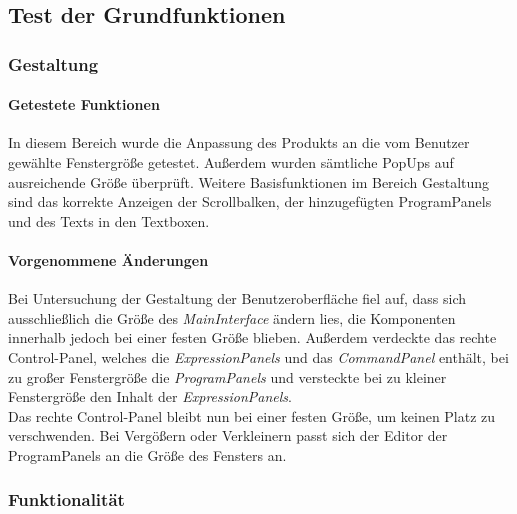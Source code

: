 \documentclass[parskip=full]{scrartcl}
\begin{document}
\subsection{Test der Grundfunktionen}
\subsubsection{Gestaltung}
\paragraph{Getestete Funktionen}
In diesem Bereich wurde die Anpassung des Produkts an die vom Benutzer gewählte Fenstergröße getestet. Außerdem wurden sämtliche PopUps auf ausreichende Größe überprüft.
Weitere Basisfunktionen im Bereich Gestaltung sind das korrekte Anzeigen der Scrollbalken, der hinzugefügten ProgramPanels und des Texts in den Textboxen.
\paragraph{Vorgenommene Änderungen}
Bei Untersuchung der Gestaltung der Benutzeroberfläche  fiel auf, dass sich ausschließlich die Größe des \textit{MainInterface} ändern lies, die Komponenten innerhalb jedoch bei einer festen Größe blieben. Außerdem verdeckte das rechte Control-Panel, welches die \textit{ExpressionPanels} und das \textit{CommandPanel} enthält, bei zu großer Fenstergröße die \textit{ProgramPanels} und versteckte bei zu kleiner Fenstergröße den Inhalt der \textit{ExpressionPanels}.\\
Das rechte Control-Panel bleibt nun bei einer festen Größe, um keinen Platz zu verschwenden. Bei Vergößern oder Verkleinern passt sich der Editor der ProgramPanels an die Größe des Fensters an.
\subsubsection{Funktionalität}
\end{document}
